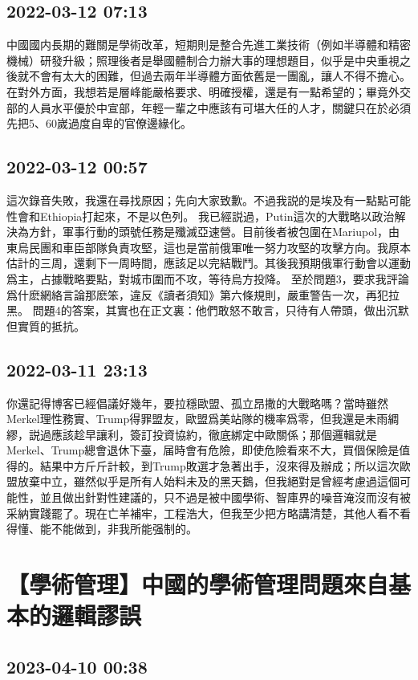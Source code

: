 \documentclass[twocolumn]{ctexart}
\begin{document}
\subsection*{2022-03-12 07:13}

中國國内長期的難關是學術改革，短期則是整合先進工業技術（例如半導體和精密機械）研發升級；照理後者是舉國體制合力辦大事的理想題目，似乎是中央重視之後就不會有太大的困難，但過去兩年半導體方面依舊是一團亂，讓人不得不擔心。
在對外方面，我想若是層峰能嚴格要求、明確授權，還是有一點希望的；畢竟外交部的人員水平優於中宣部，年輕一輩之中應該有可堪大任的人才，關鍵只在於必須先把5、60嵗過度自卑的官僚邊緣化。
\subsection*{2022-03-12 00:57}

這次錄音失敗，我還在尋找原因；先向大家致歉。不過我説的是埃及有一點點可能性會和Ethiopia打起來，不是以色列。
我已經説過，Putin這次的大戰略以政治解決為方針，軍事行動的頭號任務是殲滅亞速營。目前後者被包圍在Mariupol，由東烏民團和車臣部隊負責攻堅，這也是當前俄軍唯一努力攻堅的攻擊方向。我原本估計的三周，還剩下一周時間，應該足以完結戰鬥。其後我預期俄軍行動會以運動爲主，占據戰略要點，對城市圍而不攻，等待烏方投降。
至於問題3，要求我評論爲什麽網絡言論那麽笨，違反《讀者須知》第六條規則，嚴重警告一次，再犯拉黑。
問題4的答案，其實也在正文裏：他們敢怒不敢言，只待有人帶頭，做出沉默但實質的抵抗。
\subsection*{2022-03-11 23:13}

你還記得博客已經倡議好幾年，要拉穩歐盟、孤立昂撒的大戰略嗎？當時雖然Merkel理性務實、Trump得罪盟友，歐盟爲美站隊的機率爲零，但我還是未雨綢繆，説過應該趁早讓利，簽訂投資協約，徹底綁定中歐關係；那個邏輯就是Merkel、Trump總會退休下臺，届時會有危險，即使危險看來不大，買個保險是值得的。結果中方斤斤計較，到Trump敗選才急著出手，沒來得及辦成；所以這次歐盟放棄中立，雖然似乎是所有人始料未及的黑天鵝，但我絕對是曾經考慮過這個可能性，並且做出針對性建議的，只不過是被中國學術、智庫界的噪音淹沒而沒有被采納實踐罷了。現在亡羊補牢，工程浩大，但我至少把方略講清楚，其他人看不看得懂、能不能做到，非我所能强制的。
\section*{【學術管理】中國的學術管理問題來自基本的邏輯謬誤}
\subsection*{2023-04-10 00:38}
\end{document}
